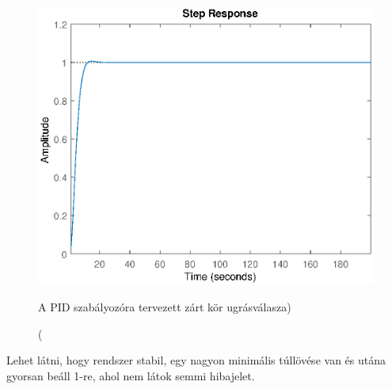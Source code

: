 \documentclass[12pt]{article}
\begin{document}
\begin{figure}[H]
\centering
\includegraphics[scale=.70]{WCCP_PID}
\caption(A PID szabályozóra tervezett zárt kör ugrásválasza)
\end{figure}
Lehet látni, hogy rendszer stabil, egy nagyon minimális túllövése van és utána gyorsan beáll 1-re, ahol nem látok semmi hibajelet.
\end{document}
